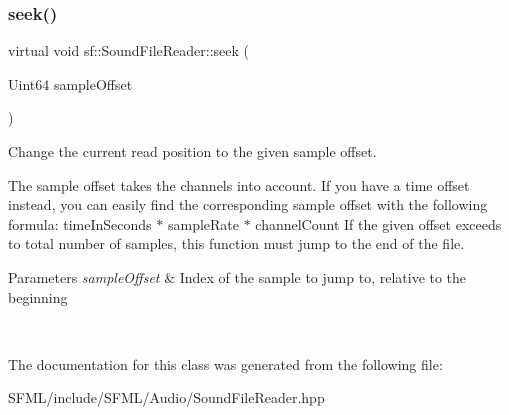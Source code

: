 \subsubsection{\texorpdfstring{seek()}{seek()}}
{\footnotesize\ttfamily virtual void sf\+::\+Sound\+File\+Reader\+::seek (\begin{DoxyParamCaption}\item[{Uint64}]{sample\+Offset }\end{DoxyParamCaption})\hspace{0.3cm}{\ttfamily [pure virtual]}}



Change the current read position to the given sample offset. 

The sample offset takes the channels into account. If you have a time offset instead, you can easily find the corresponding sample offset with the following formula\+: {\ttfamily time\+In\+Seconds $\ast$ sample\+Rate $\ast$ channel\+Count} If the given offset exceeds to total number of samples, this function must jump to the end of the file.


\begin{DoxyParams}{Parameters}
{\em sample\+Offset} & Index of the sample to jump to, relative to the beginning \begin{DoxyVerb}\end{DoxyVerb}
 \\
\hline
\end{DoxyParams}


The documentation for this class was generated from the following file\+:\begin{DoxyCompactItemize}
\item 
S\+F\+M\+L/include/\+S\+F\+M\+L/\+Audio/Sound\+File\+Reader.\+hpp\end{DoxyCompactItemize}
